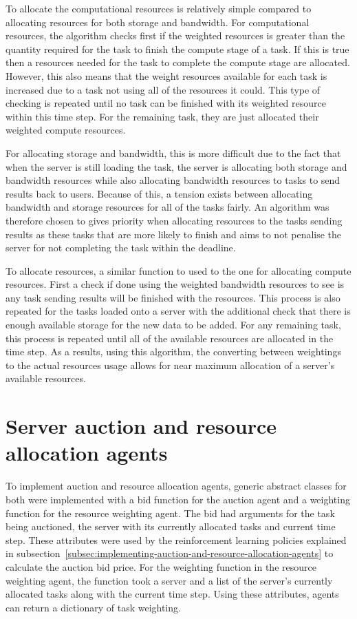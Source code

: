 To allocate the computational resources is relatively simple compared to allocating resources for both storage and
bandwidth. For computational resources, the algorithm checks first if the weighted resources is greater than the
quantity required for the task to finish the compute stage of a task. If this is true then a resources needed for the
task to complete the compute stage are allocated. However, this also means that the weight resources available for each
task is increased due to a task not using all of the resources it could. This type of checking is repeated until no task
can be finished with its weighted resource within this time step. For the remaining task, they are just allocated their
weighted compute resources.

For allocating storage and bandwidth, this is more difficult due to the fact that when the server is still
loading the task, the server is allocating both storage and bandwidth resources while also allocating bandwidth
resources to tasks to send results back to users. Because of this, a tension exists between allocating bandwidth and
storage resources for all of the tasks fairly. An algorithm was therefore chosen to gives priority when allocating
resources to the tasks sending results as these tasks that are more likely to finish and aims to not penalise the
server for not completing the task within the deadline.

To allocate resources, a similar function to used to the one for allocating compute resources. First a check if done
using the weighted bandwidth resources to see is any task sending results will be finished with the resources.
This process is also repeated for the tasks loaded onto a server with the additional check that there is enough
available storage for the new data to be added. For any remaining task, this process is repeated until all of the
available resources are allocated in the time step. As a results, using this algorithm, the converting between
weightings to the actual resources usage allows for near maximum allocation of a server's available resources.

\section{Server auction and resource allocation agents}\label{sec:implementing-auction-and-resource-allocation-agents}
To implement auction and resource allocation agents, generic abstract classes for both were implemented with a bid
function for the auction agent and a weighting function for the resource weighting agent. The bid had arguments for the
task being auctioned, the server with its currently allocated tasks and current time step. These attributes were used by
the reinforcement learning policies explained in subsection~\ref{subsec:implementing-auction-and-resource-allocation-agents}
to calculate the auction bid price. For the weighting function in the resource weighting agent, the function took a
server and a list of the server's currently allocated tasks along with the current time step. Using these attributes,
agents can return a dictionary of task weighting.


